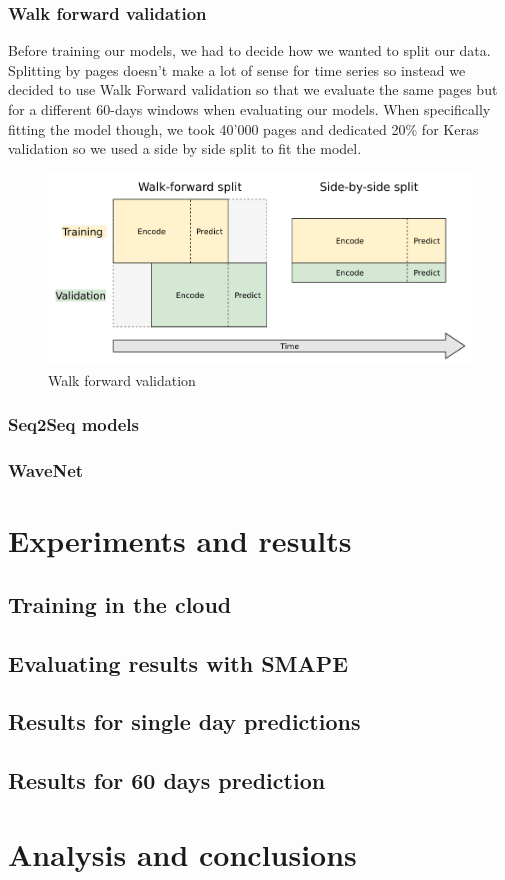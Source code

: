 \documentclass[11pt]{article}
\begin{document}
    \subsubsection{Walk forward validation}
    Before training our models, we had to decide how we wanted to split our data. Splitting by pages doesn't make a lot of sense for time series so instead we decided to use Walk Forward validation so that we evaluate the same pages but for a different 60-days windows when evaluating our models. When specifically fitting the model though, we took 40'000 pages and dedicated 20\% for Keras validation so we used a side by side split to fit the model.
    \begin{figure}[H]
        \centering
        \includegraphics[width=\textwidth]{walkforward.png}
        \caption{Walk forward validation}
    \end{figure}

    \subsubsection{Seq2Seq models}
    \subsubsection{WaveNet}
    \newpage
    \section{Experiments and results}
    \subsection{Training in the cloud}
    \subsection{Evaluating results with SMAPE}
    \subsection{Results for single day predictions}
    \subsection{Results for 60 days prediction}
    \newpage
    \section{Analysis and conclusions}
\end{document}
